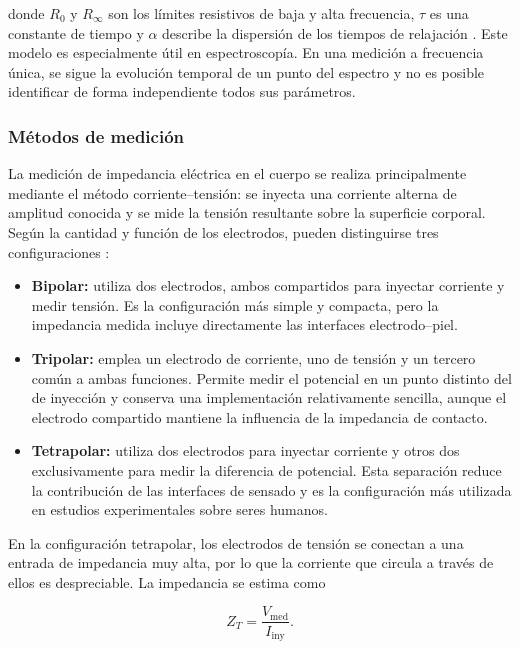 \documentclass[12pt,a4paper]{article}
\begin{document}
donde $R_0$ y $R_{\infty}$ son los límites resistivos de baja y alta frecuencia, $\tau$ es una constante
de tiempo y $\alpha$ describe la dispersión de los tiempos de relajación \cite{cole1940permeability}.
Este modelo es especialmente útil en espectroscopía. En una medición a frecuencia única, se sigue la 
evolución temporal de un punto del espectro y no es posible identificar de forma independiente todos sus parámetros.

\subsubsection{Métodos de medición}

La medición de impedancia eléctrica en el cuerpo se realiza principalmente mediante el método
corriente--tensión: se inyecta una corriente alterna de amplitud conocida y se mide la tensión
resultante sobre la superficie corporal. Según la cantidad y función de los electrodos, pueden
distinguirse tres configuraciones \cite{noyori2022review}:

\begin{itemize}
    \item \textbf{Bipolar:} utiliza dos electrodos, ambos compartidos para inyectar corriente y medir
    tensión. Es la configuración más simple y compacta, pero la impedancia medida incluye directamente
    las interfaces electrodo--piel.
    \item \textbf{Tripolar:} emplea un electrodo de corriente, uno de tensión y un tercero común a
    ambas funciones. Permite medir el potencial en un punto distinto del de inyección y conserva una
    implementación relativamente sencilla, aunque el electrodo compartido mantiene la influencia de
    la impedancia de contacto.
    \item \textbf{Tetrapolar:} utiliza dos electrodos para inyectar corriente y otros dos exclusivamente
    para medir la diferencia de potencial. Esta separación reduce la contribución de las interfaces de
    sensado y es la configuración más utilizada en estudios experimentales sobre seres humanos.
\end{itemize}

En la configuración tetrapolar, los electrodos de tensión se conectan a una entrada de impedancia muy
alta, por lo que la corriente que circula a través de ellos es despreciable. La impedancia se estima
como

\begin{equation}
    Z_{T}=\frac{V_{\mathrm{med}}}{I_{\mathrm{iny}}}.
\end{equation}
\end{document}
